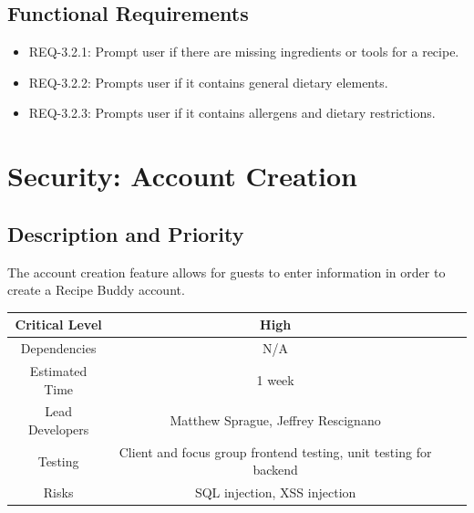 \documentclass{scrreprt}
\begin{document}
\subsection{\gls{Functional Requirements}}

\begin{itemize}
    \item REQ-3.2.1: Prompt user if there are missing ingredients or tools for a recipe.
    \item REQ-3.2.2: Prompts user if it contains general dietary elements.
    \item REQ-3.2.3: Prompts user if it contains allergens and dietary restrictions.
\end{itemize}

\section{Security: Account Creation}

\subsection{Description and Priority}

The account creation feature allows for guests to enter information in order to create a \gls{Recipe Buddy} account.

\begin{center}
    \begin{tabular}{| c | c | c | c |}
        \hline
        Critical Level  & High                                                              \\
        \hline
        Dependencies    & N/A                                                               \\
        \hline
        Estimated Time  & 1 week                                                            \\
        \hline
        Lead Developers & Matthew Sprague, Jeffrey Rescignano                               \\
        \hline
        Testing         & Client and focus group \gls{frontend} testing,
                          \gls{unit testing} for \gls{backend}                              \\
        \hline
        Risks           & \gls{SQL injection}, \gls{XSS injection}                          \\
        \hline
    \end{tabular}
\end{center}
\end{document}
